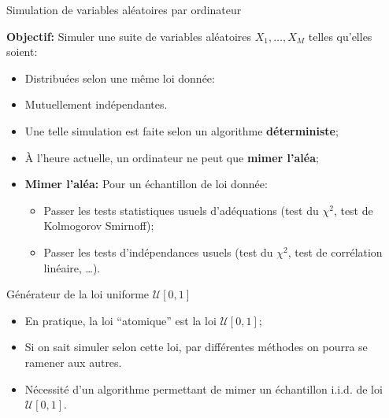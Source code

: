 \documentclass[ignorenonframetext,]{beamer}
\providecommand{\tightlist}{%
  \setlength{\itemsep}{0pt}\setlength{\parskip}{0pt}}
\begin{document}
\begin{frame}{Simulation de variables aléatoires par ordinateur}
\protect\hypertarget{simulation-de-variables-aluxe9atoires-par-ordinateur}{}

\textbf{Objectif: } Simuler une suite de variables aléatoires
\(X_1, \dots, X_M\) telles qu'elles soient:

\begin{itemize}
\item
  Distribuées selon une même loi donnée:
\item
  Mutuellement indépendantes.\pause
\item
  Une telle simulation est faite selon un algorithme
  \textbf{déterministe};\pause
\item
  À l'heure actuelle, un ordinateur ne peut que \textbf{mimer
  l'aléa};\pause
\item
  \textbf{Mimer l'aléa:} Pour un échantillon de loi donnée:

  \begin{itemize}
  \tightlist
  \item
    Passer les tests statistiques usuels d'adéquations (test du
    \(\chi^2\), test de Kolmogorov Smirnoff);
  \item
    Passer les tests d'indépendances usuels (test du \(\chi^2\), test de
    corrélation linéaire, \ldots{}).
  \end{itemize}
\end{itemize}

\end{frame}

\begin{frame}{Générateur de la loi uniforme \(\mathcal{U}[0, 1]\)}
\protect\hypertarget{guxe9nuxe9rateur-de-la-loi-uniforme-mathcalu0-1}{}

\begin{itemize}
\tightlist
\item
  En pratique, la loi ``atomique'' est la loi
  \(\mathcal{U}[0, 1]\);\pause
\item
  Si on sait simuler selon cette loi, par différentes méthodes on pourra
  se ramener aux autres.\pause
\item
  Nécessité d'un algorithme permettant de mimer un échantillon i.i.d. de
  loi \(\mathcal{U}[0, 1]\).
\end{itemize}

\end{frame}
\end{document}
